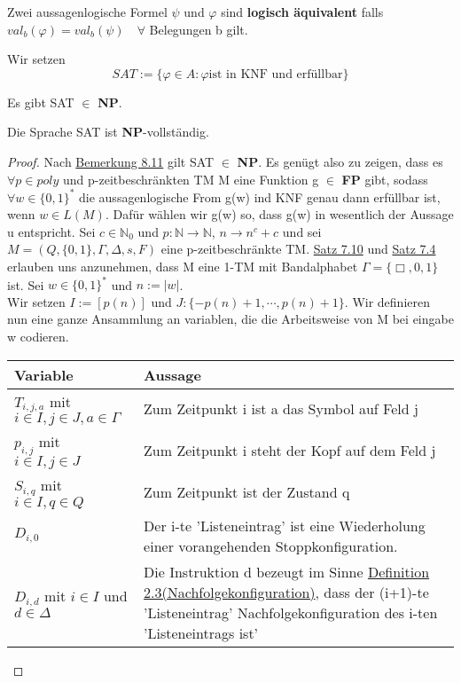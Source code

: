     Zwei aussagenlogische Formel \(\psi\) und \(\varphi\) sind \textbf{logisch äquivalent} falls \(val_b(\varphi) = val_b(\psi) \quad \forall\) Belegungen b gilt.

    Wir setzen 
    \[
        SAT := \{\varphi \in A : \varphi \text{ist in KNF und erfüllbar}\}  
    \]

    Es gibt SAT \(\in\) \textbf{NP}.

    Die Sprache SAT ist \textbf{NP}-vollständig. 
    \begin{proof}
        Nach \hyperref[subsec:8.11]{Bemerkung 8.11} gilt SAT \(\in\) \textbf{NP}. Es genügt also zu zeigen, dass es \(\forall p \in poly\) und p-zeitbeschränkten TM M eine Funktion g \(\in\) \textbf{FP} gibt, sodass \(\forall w \in \{0, 1\}^*\) die aussagenlogische From g(w) ind KNF genau dann erfüllbar ist, wenn \(w \in L(M)\). Dafür wählen wir g(w) so, dass g(w) in wesentlich der Aussage u entspricht. Sei \(c \in \mathbb{N}_0\) und \(p: \mathbb{N} \to \mathbb{N}\), \(n \to n^c + c\) und sei \(M = (Q, \{0, 1\}, \Gamma, \Delta, s, F)\) eine p-zeitbeschränkte TM. \hyperref[subsec:7.10]{Satz 7.10} und \hyperref[subsec:7.4]{Satz 7.4} erlauben uns anzunehmen, dass M eine 1-TM mit Bandalphabet \(\Gamma = \{\Box, 0, 1\}\) ist. Sei \(w \in \{0, 1\}^*\) und \(n :=|w|\).
        \vspace*{0.5cm}
        \\
        Wir setzen \(I:= [p(n)]\) und \(J: \{-p(n)+1, \cdots, p(n)+1\}\). Wir definieren nun eine ganze Ansammlung an variablen, die die Arbeitsweise von M bei eingabe w codieren.
        \begin{center}
            \setlength{\extrarowheight}{3pt} %
            \begin{tabular}{l|p{10cm}}
                Variable & Aussage \\
                \hline
                \hline
                \(T_{i, j, a}\) mit \(i \in I, j \in J, a \in \Gamma\) & Zum Zeitpunkt i ist a das Symbol auf Feld j \\
                \hline
                \(p_{i, j}\) mit \(i \in I, j \in J\) & Zum Zeitpunkt i steht der Kopf auf dem Feld j \\
                \hline
                \(S_{i, q}\) mit \(i \in I, q \in Q\) & Zum Zeitpunkt ist der Zustand q \\
                \hline
                \(D_{i, 0}\) & Der i-te 'Listeneintrag' ist eine Wiederholung einer vorangehenden Stoppkonfiguration. \\
                \hline
                \(D_{i, d}\) mit \(i \in I\) und \(d \in \Delta\) & Die Instruktion d bezeugt im Sinne \hyperref[subsec:2.3]{Definition 2.3(Nachfolgekonfiguration)}, dass der (i+1)-te 'Listeneintrag' Nachfolgekonfiguration des i-ten 'Listeneintrags ist' \\
            \end{tabular}    
        \end{center}

\end{proof}

